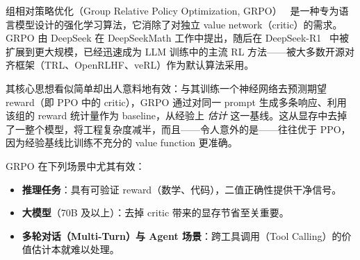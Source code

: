 组相对策略优化（Group Relative Policy Optimization, GRPO）~\cite{shao2024deepseekmath} 是一种专为语言模型设计的强化学习算法，它消除了对独立 value network（critic）的需求。GRPO 由 DeepSeek 在 DeepSeekMath 工作中提出，随后在 DeepSeek-R1~\cite{deepseek2025r1} 中被扩展到更大规模，已经迅速成为 LLM 训练中的主流 RL 方法——被大多数开源对齐框架（TRL、OpenRLHF、veRL）作为默认算法采用。

其核心思想看似简单却出人意料地有效：与其训练一个神经网络去预测期望 reward（即 PPO 中的 critic），GRPO 通过对同一 prompt 生成多条响应、利用该组的 reward 统计量作为 baseline，从经验上 \emph{估计} 这一基线。这从显存中去掉了一整个模型，将工程复杂度减半，而且——令人意外的是——往往优于 PPO，因为经验基线比训练不充分的 value function 更准确。

GRPO 在下列场景中尤其有效：

\begin{itemize}
  \item \textbf{推理任务}：具有可验证 reward（数学、代码），二值正确性提供干净信号。
  \item \textbf{大模型}（70B 及以上）：去掉 critic 带来的显存节省至关重要。
  \item \textbf{多轮对话（Multi-Turn）与 Agent 场景}：跨工具调用（Tool Calling）的价值估计本就难以处理。
\end{itemize}

